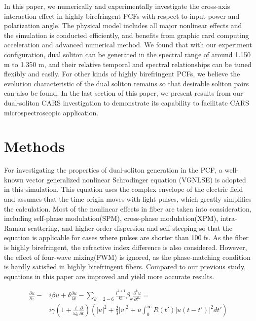 \documentclass{osa-article}
\begin{document}
In this paper, we numerically and experimentally investigate the cross-axis interaction effect in highly birefringent PCFs with respect to input power and polarization angle. The physical model includes all major nonlinear effects and the simulation is conducted efficiently, and benefits from graphic card computing acceleration and advanced numerical method. We found that with our experiment configuration, dual soliton can be generated in the spectral range of around 1.150 \textmu m to 1.350 \textmu m, and their relative temporal and spectral relationships can be tuned flexibly and easily. For other kinds of highly birefringent PCFs, we believe the evolution characteristic of the dual soliton remains so that desirable soliton pairs can also be found. In the last section of this paper, we present results from our dual-soliton CARS investigation to demonstrate its capability to facilitate CARS microspectroscopic application. 
\section{Methods}

For investigating the properties of dual-soliton generation in the PCF, a well-known vector generalized nonlinear Schrodinger equation (VGNLSE)\cite{husakou_supercontinuum_2001,agrawal_nonlinear_2013} is adopted in this simulation. This equation uses the complex envelope of the electric field and assumes that the time origin moves with light pulses, which greatly simplifies the calculation. Most of the nonlinear effects in fiber are taken into consideration, including self-phase modulation(SPM), cross-phase modulation(XPM), intra-Raman scattering, and higher-order dispersion and self-steeping so that the equation is applicable for cases where pulses are shorter than 100 fs\cite{agrawal_nonlinear_2013}. As the fiber is highly birefringent, the refractive index difference is also considered. However, the effect of four-wave mixing(FWM) is ignored, as the phase-matching condition is hardly satisfied in highly birefringent fibers. Compared to our previous study\cite{chen_dual-soliton_2016}, equations in this paper are improved and yield more accurate results.  

\begin{equation}
\begin{split}
\frac{\partial u}{\partial z} - & i\beta u + \delta \frac{\partial u}{\partial t}-\sum_{k=2-6}\frac{i^{k+1}}{k!}\beta_k\frac{\partial^k u}{\partial t^k} =\\
 & i\gamma\left(1+\frac{i}{\omega_0}\frac{\partial}{\partial t}\right)\left(|u|^2+\frac{2}{3}|v|^2+u\int_0^\infty{R(t')|u(t-t')|^2dt'} \right)
\label{eq1}
\end{split}
\end{equation}
\end{document}
